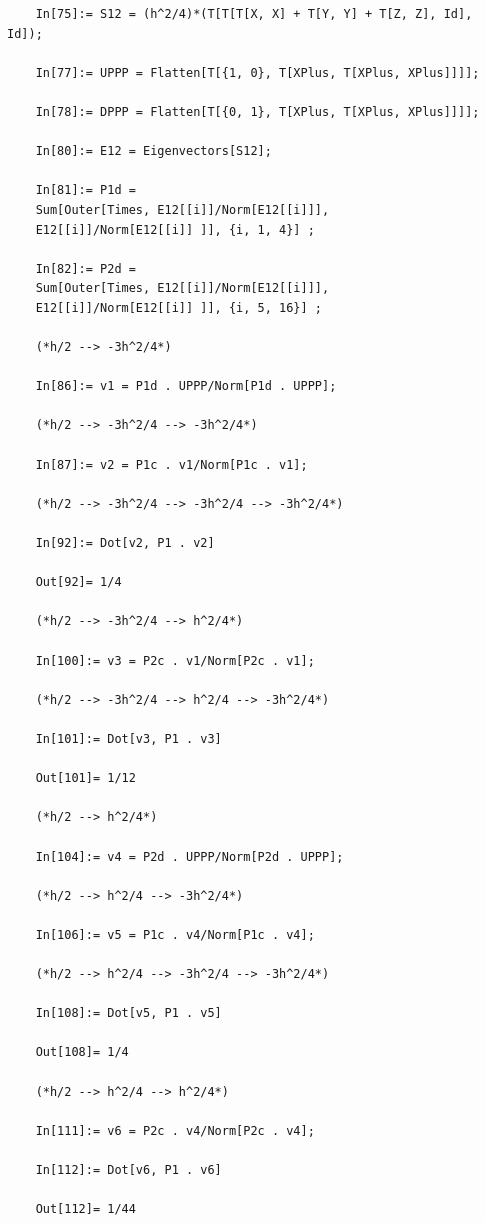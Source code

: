 \documentclass{article}
\theoremstyle{definition}
\begin{document}
\begin{enumerate}[label=(\alph*)]
\begin{lstlisting}
	In[75]:= S12 = (h^2/4)*(T[T[T[X, X] + T[Y, Y] + T[Z, Z], Id], Id]);
	
	In[77]:= UPPP = Flatten[T[{1, 0}, T[XPlus, T[XPlus, XPlus]]]];
	
	In[78]:= DPPP = Flatten[T[{0, 1}, T[XPlus, T[XPlus, XPlus]]]];
	
	In[80]:= E12 = Eigenvectors[S12];
	
	In[81]:= P1d = 
	Sum[Outer[Times, E12[[i]]/Norm[E12[[i]]], 
	E12[[i]]/Norm[E12[[i]] ]], {i, 1, 4}] ;
	
	In[82]:= P2d = 
	Sum[Outer[Times, E12[[i]]/Norm[E12[[i]]], 
	E12[[i]]/Norm[E12[[i]] ]], {i, 5, 16}] ;
	
	(*h/2 --> -3h^2/4*)
	
	In[86]:= v1 = P1d . UPPP/Norm[P1d . UPPP];
	
	(*h/2 --> -3h^2/4 --> -3h^2/4*)
	
	In[87]:= v2 = P1c . v1/Norm[P1c . v1];
	
	(*h/2 --> -3h^2/4 --> -3h^2/4 --> -3h^2/4*)
	
	In[92]:= Dot[v2, P1 . v2]
	
	Out[92]= 1/4
	
	(*h/2 --> -3h^2/4 --> h^2/4*)
	
	In[100]:= v3 = P2c . v1/Norm[P2c . v1];
	
	(*h/2 --> -3h^2/4 --> h^2/4 --> -3h^2/4*)
	
	In[101]:= Dot[v3, P1 . v3]
	
	Out[101]= 1/12
	
	(*h/2 --> h^2/4*)
	
	In[104]:= v4 = P2d . UPPP/Norm[P2d . UPPP];
	
	(*h/2 --> h^2/4 --> -3h^2/4*)
	
	In[106]:= v5 = P1c . v4/Norm[P1c . v4];
	
	(*h/2 --> h^2/4 --> -3h^2/4 --> -3h^2/4*)
	
	In[108]:= Dot[v5, P1 . v5]
	
	Out[108]= 1/4
	
	(*h/2 --> h^2/4 --> h^2/4*)
	
	In[111]:= v6 = P2c . v4/Norm[P2c . v4];
	
	In[112]:= Dot[v6, P1 . v6]
	
	Out[112]= 1/44
	\end{lstlisting}
	

\end{enumerate}
\end{document}
